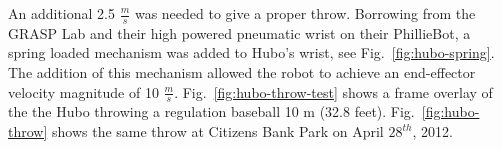 An additional 2.5 $\frac{m}{s}$ was needed to give a proper throw.  
Borrowing from the GRASP Lab and their high powered pneumatic wrist on their PhillieBot, a spring loaded mechanism was added to Hubo's wrist, see Fig.~\ref{fig:hubo-spring}.
The addition of this mechanism allowed the robot to achieve an end-effector velocity magnitude of 10 $\frac{m}{s}$.
Fig.~\ref{fig:hubo-throw-test} shows a frame overlay of the the Hubo throwing a regulation baseball 10 m (32.8 feet).
Fig.~\ref{fig:hubo-throw} shows the same throw at Citizens Bank Park on April $28^{th}$, 2012.




